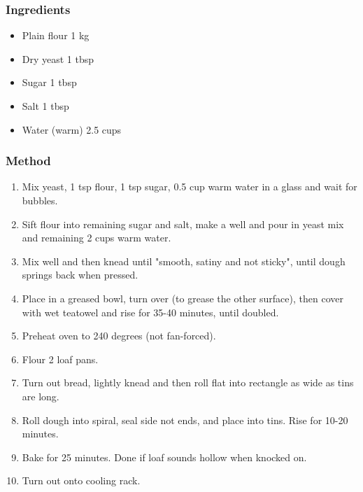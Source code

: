 \documentclass[]{article}
\begin{document}
\subsubsection*{\Large Ingredients}
\begin{multicols}{2}
\begin{itemize}
 \item Plain flour \hfill 1 kg
 \item Dry yeast \hfill 1 tbsp
 \item Sugar \hfill 1 tbsp
 \item Salt \hfill 1 tbsp
 \item Water (warm) \hfill 2.5 cups
\end{itemize}
\end{multicols}
\subsubsection*{\Large Method}
\begin{enumerate}[font=\huge\color{accent}]
	\item Mix yeast, 1 tsp flour, 1 tsp sugar, 0.5 cup warm water in a glass and wait for bubbles.
	\item Sift flour into remaining sugar and salt, make a well and pour in yeast mix and remaining 2 cups warm water.
	\item Mix well and then knead until "smooth, satiny and not sticky", until dough springs back when pressed.
	\item Place in a greased bowl, turn over (to grease the other surface), then cover with wet teatowel and rise for 35-40 minutes, until doubled.
	\item Preheat oven to 240 degrees (not fan-forced).
	\item Flour 2 loaf pans.
	\item Turn out bread, lightly knead and then roll flat into rectangle as wide as tins are long.
	\item Roll dough into spiral, seal side not ends, and place into tins. Rise for 10-20 minutes.
	\item Bake for 25 minutes. Done if loaf sounds hollow when knocked on.
	\item Turn out onto cooling rack.
\end{enumerate}
\newpage
{}\label{rec:White bread (crusty, no-knead)}
\end{document}
